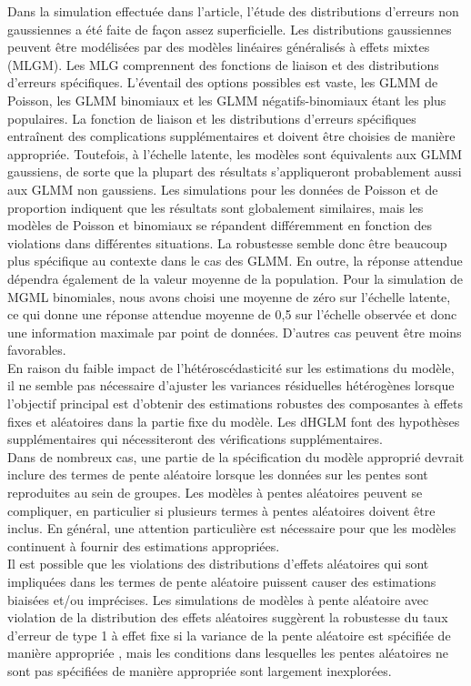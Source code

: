 \documentclass{article}
\begin{document}
Dans la simulation effectuée dans l’article, l’étude des distributions d'erreurs non gaussiennes a été faite de façon assez superficielle. Les distributions gaussiennes peuvent être modélisées par des modèles linéaires généralisés à effets mixtes (MLGM). Les MLG comprennent des fonctions de liaison et des distributions d'erreurs spécifiques. L'éventail des options possibles est vaste, les GLMM de Poisson, les GLMM binomiaux et les GLMM négatifs-binomiaux étant les plus populaires. La fonction de liaison et les distributions d'erreurs spécifiques entraînent des complications supplémentaires et doivent être choisies de manière appropriée. Toutefois, à l'échelle latente, les modèles sont équivalents aux GLMM gaussiens, de sorte que la plupart des résultats s'appliqueront probablement aussi aux GLMM non gaussiens. Les simulations pour les données de Poisson et de proportion indiquent que les résultats sont globalement similaires, mais les modèles de Poisson et binomiaux se répandent différemment en fonction des violations dans différentes situations. La robustesse semble donc être beaucoup plus spécifique au contexte dans le cas des GLMM. En outre, la réponse attendue dépendra également de la valeur moyenne de la population. Pour la simulation de MGML binomiales, nous avons choisi une moyenne de zéro sur l'échelle latente, ce qui donne une réponse attendue moyenne de 0,5 sur l'échelle observée et donc une information maximale par point de données. D'autres cas peuvent être moins favorables. \\

En raison du faible impact de l'hétéroscédasticité sur les estimations du modèle, il ne semble pas nécessaire d'ajuster les variances résiduelles hétérogènes lorsque l'objectif principal est d'obtenir des estimations robustes des composantes à effets fixes et aléatoires dans la partie fixe du modèle. Les dHGLM font des hypothèses supplémentaires qui nécessiteront des vérifications supplémentaires. \\
Dans de nombreux cas, une partie de la spécification du modèle approprié devrait inclure des termes de pente aléatoire lorsque les données sur les pentes sont reproduites au sein de groupes. Les modèles à pentes aléatoires peuvent se compliquer, en particulier si plusieurs termes à pentes aléatoires doivent être inclus. En général, une attention particulière est nécessaire pour que les modèles continuent à fournir des estimations appropriées. \\

Il est possible que les violations des distributions d'effets aléatoires qui sont impliquées dans les termes de pente aléatoire puissent causer des estimations biaisées et/ou imprécises. Les simulations de modèles à pente aléatoire avec violation de la distribution des effets aléatoires suggèrent la robustesse du taux d'erreur de type 1 à effet fixe si la variance de la pente aléatoire est spécifiée de manière appropriée , mais les conditions dans lesquelles les pentes aléatoires ne sont pas spécifiées de manière appropriée sont largement inexplorées. \\
\end{document}
